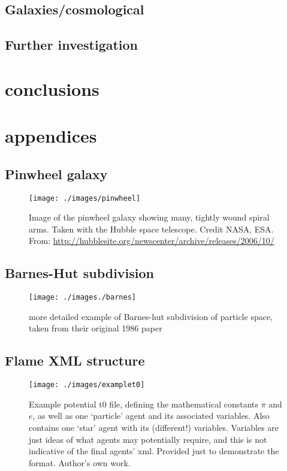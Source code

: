 \documentclass[11pt,a4paper]{article}
\begin{document}
\subsection{Galaxies/cosmological}

\subsection{Further investigation}

\section{conclusions}

\newpage
{}


\newpage
\appendix


\section{appendices}

\subsection{Pinwheel galaxy}
\label{pinwheel}
\begin{figure}[h]
\texttt{[image: ./images/pinwheel]}
\caption[The Pinwheel galaxy]{Image of the pinwheel galaxy showing many, tightly wound spiral arms. Taken with the Hubble space telescope. Credit NASA, ESA. From: \url{http://hubblesite.org/newscenter/archive/releases/2006/10/}}
\end{figure}

\subsection{Barnes-Hut subdivision}
\label{barnesHutImg}
\begin{figure}[h!]
\texttt{[image: ./images./barnes]}
\caption[Barnes-Hut particle-space subdivision, from their initial paper.]{more detailed example of Barnes-hut subdivision of particle space, taken from their original 1986 paper \cite{barneshut}}
\end{figure}

\subsection{Flame XML structure}
\label{examplet0}
\begin{figure}[h!]
\texttt{[image: ./images/examplet0]}
\caption[Example FLAME agent XML structure]{Example potential t0 file, defining the mathematical constants $\pi$ and $e$, as well as one `particle' agent and its associated variables. Also contains one `star' agent with its (different!) variables. Variables are just ideas of what agents may potentially require, and this is not indicative of the final agents' xml. Provided just to demonstrate the format. Author's own work.}
\end{figure}
\end{document}
